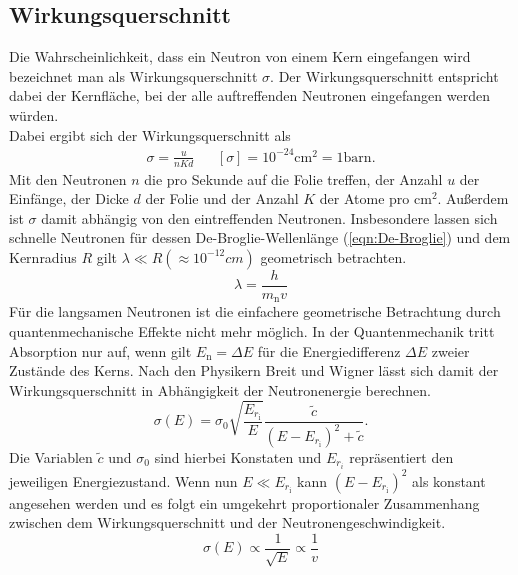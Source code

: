\subsection{Wirkungsquerschnitt}
Die Wahrscheinlichkeit, dass ein Neutron von einem Kern eingefangen wird bezeichnet man als Wirkungsquerschnitt $\sigma$.
Der Wirkungsquerschnitt entspricht dabei der Kernfläche, bei der alle auftreffenden Neutronen eingefangen werden würden.\\  
Dabei ergibt sich der Wirkungsquerschnitt als 
\begin{align}
    \sigma = \frac{u}{nKd} && [\sigma] = 10^{-24} \text{cm}^2 = 1 \text{barn}.
\end{align}
Mit den Neutronen $n$ die pro Sekunde auf die Folie treffen, der Anzahl $u$ der Einfänge, der Dicke $d$ der Folie und der Anzahl $K$ der Atome pro $\text{cm}^2$.
Außerdem ist $\sigma$ damit abhängig von den eintreffenden Neutronen.
Insbesondere lassen sich schnelle Neutronen für dessen De-Broglie-Wellenlänge (\ref{eqn:De-Broglie}) und dem Kernradius $R$ gilt $\lambda \ll R (≈10^{-12}cm) $ geometrisch betrachten.
\begin{equation}
     \lambda = \frac{h}{m_{\text{n}} v} \label{eqn:De-Broglie}
\end{equation}
Für die langsamen Neutronen ist die einfachere geometrische Betrachtung durch quantenmechanische Effekte nicht mehr möglich.
In der Quantenmechanik tritt Absorption nur auf, wenn gilt $E_{\text{n}} = \Delta E$ für die Energiedifferenz $\Delta E$ zweier Zustände des Kerns.
Nach den Physikern Breit und Wigner lässt sich damit der Wirkungsquerschnitt in Abhängigkeit der Neutronenergie berechnen.
\begin{equation}
    \sigma(E) = \sigma_0 \sqrt{\frac{E_{r_{\text{i}}}}{E}} \frac{\tilde{c}}{\left(E-E_{r_{\text{i}}}\right)^2 + \tilde{c}}.
\end{equation}
Die Variablen $\tilde{c}$ und $\sigma_0$ sind hierbei Konstaten und $E_{r_i}$ repräsentiert den jeweiligen Energiezustand.
Wenn nun $E \ll E_{r_{\text{i}}}$ kann $\left(E-E_{r_{\text{i}}}\right)^2$ als konstant angesehen werden und es folgt ein umgekehrt proportionaler Zusammenhang 
zwischen dem Wirkungsquerschnitt und der Neutronengeschwindigkeit.
\begin{equation}
    \sigma(E) \propto \frac{1}{\sqrt{E}} \propto \frac{1}{v}
\end{equation}

